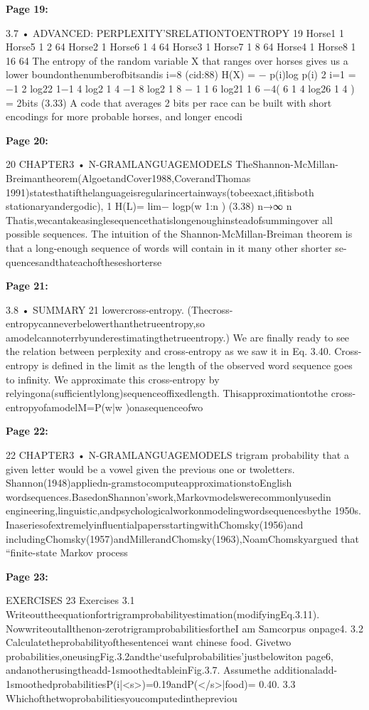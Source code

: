 \documentclass[11pt,a4paper]{article}
\begin{document}
\textbf{Page 19:}

3.7 • ADVANCED: PERPLEXITY’SRELATIONTOENTROPY 19
Horse1 1 Horse5 1
2 64
Horse2 1 Horse6 1
4 64
Horse3 1 Horse7 1
8 64
Horse4 1 Horse8 1
16 64
The entropy of the random variable X that ranges over horses gives us a lower
boundonthenumberofbitsandis
i=8
(cid:88)
H(X) = − p(i)log p(i)
2
i=1
= −1
2
log22 1−1
4
log2 1
4
−1
8
log2 1
8
−
1
1
6
log21 1
6
−4(
6
1
4
log26 1
4
)
= 2bits (3.33)
A code that averages 2 bits per race can be built with short encodings for more
probable horses, and longer encodi

\textbf{Page 20:}

20 CHAPTER3 • N-GRAMLANGUAGEMODELS
TheShannon-McMillan-Breimantheorem(AlgoetandCover1988,CoverandThomas
1991)statesthatifthelanguageisregularincertainways(tobeexact,ifitisboth
stationaryandergodic),
1
H(L)= lim− logp(w 1:n ) (3.38)
n→∞ n
Thatis,wecantakeasinglesequencethatislongenoughinsteadofsummingover
all possible sequences. The intuition of the Shannon-McMillan-Breiman theorem
is that a long-enough sequence of words will contain in it many other shorter se-
quencesandthateachoftheseshorterse

\textbf{Page 21:}

3.8 • SUMMARY 21
lowercross-entropy. (Thecross-entropycanneverbelowerthanthetrueentropy,so
amodelcannoterrbyunderestimatingthetrueentropy.)
We are finally ready to see the relation between perplexity and cross-entropy
as we saw it in Eq. 3.40. Cross-entropy is defined in the limit as the length of the
observed word sequence goes to infinity. We approximate this cross-entropy by
relyingona(sufficientlylong)sequenceoffixedlength. Thisapproximationtothe
cross-entropyofamodelM=P(w|w )onasequenceofwo

\textbf{Page 22:}

22 CHAPTER3 • N-GRAMLANGUAGEMODELS
trigram probability that a given letter would be a vowel given the previous one or
twoletters. Shannon(1948)appliedn-gramstocomputeapproximationstoEnglish
wordsequences.BasedonShannon’swork,Markovmodelswerecommonlyusedin
engineering,linguistic,andpsychologicalworkonmodelingwordsequencesbythe
1950s. InaseriesofextremelyinfluentialpapersstartingwithChomsky(1956)and
includingChomsky(1957)andMillerandChomsky(1963),NoamChomskyargued
that “finite-state Markov process

\textbf{Page 23:}

EXERCISES 23
Exercises
3.1 Writeouttheequationfortrigramprobabilityestimation(modifyingEq.3.11).
Nowwriteoutallthenon-zerotrigramprobabilitiesfortheI am Samcorpus
onpage4.
3.2 Calculatetheprobabilityofthesentencei want chinese food. Givetwo
probabilities,oneusingFig.3.2andthe‘usefulprobabilities’justbelowiton
page6, andanotherusingtheadd-1smoothedtableinFig.3.7. Assumethe
additionaladd-1smoothedprobabilitiesP(i|<s>)=0.19andP(</s>|food)=
0.40.
3.3 Whichofthetwoprobabilitiesyoucomputedinthepreviou
\end{document}
